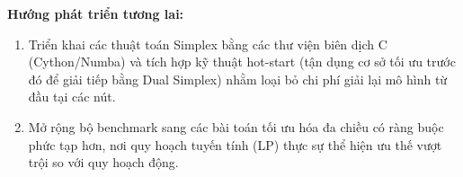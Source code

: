 \documentclass[fontsize=13pt,a4paper]{report}
\begin{document}
\textbf{Hướng phát triển tương lai:}
\begin{enumerate}[leftmargin=*]
    \item Triển khai các thuật toán Simplex bằng các thư viện biên dịch C (Cython/Numba) và tích hợp kỹ thuật hot-start (tận dụng cơ sở tối ưu trước đó để giải tiếp bằng Dual Simplex) nhằm loại bỏ chi phí giải lại mô hình từ đầu tại các nút.
    \item Mở rộng bộ benchmark sang các bài toán tối ưu hóa đa chiều có ràng buộc phức tạp hơn, nơi quy hoạch tuyến tính (LP) thực sự thể hiện ưu thế vượt trội so với quy hoạch động.
\end{enumerate}

 
\end{document}
